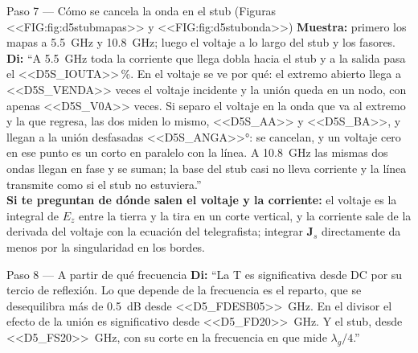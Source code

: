 \documentclass[11pt,letterpaper]{article}
\begin{document}
\begin{paso}{Paso 7 --- Cómo se cancela la onda en el stub (Figuras <<FIG:fig:d5stubmapas>> y <<FIG:fig:d5stubonda>>)}
\textbf{Muestra:} primero los mapas a \SI{5.5}{GHz} y \SI{10.8}{GHz}; luego el voltaje a lo largo del stub y los fasores.\\
\textbf{Di:} ``A \SI{5.5}{GHz} toda la corriente que llega dobla hacia el stub y a la salida pasa el <<D5S_IOUTA>>\,\%. En el voltaje se ve por qué: el extremo abierto llega a <<D5S_VENDA>> veces el voltaje incidente y la unión queda en un nodo, con apenas <<D5S_V0A>> veces. Si separo el voltaje en la onda que va al extremo y la que regresa, las dos miden lo mismo, <<D5S_AA>> y <<D5S_BA>>, y llegan a la unión desfasadas \ang{<<D5S_ANGA>>}: se cancelan, y un voltaje cero en ese punto es un corto en paralelo con la línea. A \SI{10.8}{GHz} las mismas dos ondas llegan en fase y se suman; la base del stub casi no lleva corriente y la línea transmite como si el stub no estuviera.''\\
\textbf{Si te preguntan de dónde salen el voltaje y la corriente:} el voltaje es la integral de $E_z$ entre la tierra y la tira en un corte vertical, y la corriente sale de la derivada del voltaje con la ecuación del telegrafista; integrar $\mathbf{J}_s$ directamente da menos por la singularidad en los bordes.
\end{paso}

\begin{paso}{Paso 8 --- A partir de qué frecuencia}
\textbf{Di:} ``La T es significativa desde DC por su tercio de reflexión. Lo que depende de la frecuencia es el reparto, que se desequilibra más de \SI{0.5}{dB} desde \SI{<<D5_FDESB05>>}{GHz}. En el divisor el efecto de la unión es significativo desde \SI{<<D5_FD20>>}{GHz}. Y el stub, desde \SI{<<D5_FS20>>}{GHz}, con su corte en la frecuencia en que mide $\lambda_g/4$.''
\end{paso}
\end{document}
